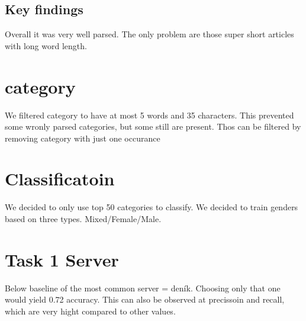\documentclass{article}
\begin{document}
    \subsection{Key findings}
    Overall it was very well parsed. The only problem are those super short articles with long word length.


    \section{category}
    We filtered category to have at most
    5 words and 35 characters.
    This prevented some wronly parsed categories, but some still are present.
    Thos can be filtered by removing
    category with just one occurance

    \section{Classificatoin}
    We decided to only use top 50 categories to classify.
    We decided to train genders based on three types.
    Mixed/Female/Male.

    \section{Task 1 Server}
    Below baseline of the most common server = deník.
    Choosing only that one would yield 0.72 accuracy.
    This can also be observed at precissoin and recall,
    which are very hight compared to other values.
    


    





    




    



    \printbibliography
\end{document}
